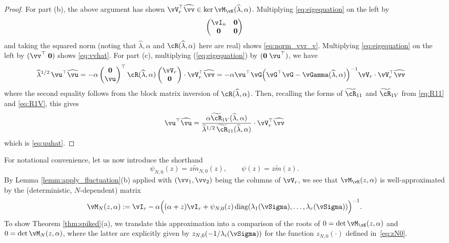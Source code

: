 \begin{proof}
For part (b), the above argument has shown $\vV_r^\top \widehat \vv \in \ker
\vM_{\vK}(\widehat\lambda,\alpha)$. Multiplying
\eqref{eq:eigequation} on the left by
$$\begin{pmatrix} \vI_n & \mathbf{0} \\
	\mathbf{0} & \mathbf{0} \end{pmatrix}$$
and taking the squared norm (noting that $\widehat\lambda,\alpha$
and $\vcR(\widehat\lambda,\alpha)$ here are real) shows \eqref{eq:norm_vvr_v}.
Multiplying \eqref{eq:eigequation} on the left by $(\vv^\top\;\mathbf{0})$ shows
\eqref{eq:vvhat}. For part (c),
multiplying (\ref{eq:eigequation}) by $(\mathbf{0}\;\vu^\top)$, we have
\begin{align*}
\widehat\lambda^{1/2}\,\vu^\top \widehat\vu&=-\alpha\begin{pmatrix} \mathbf{0}\\ \vu \end{pmatrix}^\top
\vcR(\widehat\lambda,\alpha)\begin{pmatrix} \vV_r \\ \mathbf{0} \end{pmatrix} \cdot \vV_r^\top \widehat\vv
=-\alpha \vu^\top \vG \Big(\vG^\top \vG-\vGamma(\widehat\lambda,\alpha)\Big)^{-1}\vV_r
\cdot \vV_r^\top \widehat\vv
\end{align*}
where the second equality follows from the block matrix inversion of
$\vcR(\widehat\lambda,\alpha)$.
Then, recalling the forms of $\widetilde
\cR_{11}$ and $\widetilde \vcR_{1V}$ from \eqref{eq:R11} and \eqref{eq:R1V},
this gives
\[\vu^\top \widehat\vu=\frac{\alpha \widetilde
\vcR_{1V}(\widehat\lambda,\alpha)}{\widehat\lambda^{1/2}\,\widetilde
\cR_{11}(\widehat\lambda,\alpha)} \cdot \vV_r^\top \widehat\vv\]
which is \eqref{eq:uuhat}.
\end{proof}

For notational convenience, let us now introduce the shorthand
\[\psi_{N,0}(z)=z\tilde m_{N,0}(z), \qquad \psi(z)=z\tilde m(z).\]
By Lemma \ref{lemm:apply_fluctuation}(b) applied with $(\vv_1,\vv_2)$ being the
columns of $\vV_r$,
we see that $\vM_{\vK}(z,\alpha)$ is well-approximated by the (deterministic,
$N$-dependent) matrix
\begin{align}\label{eq:M(z)}
\vM_N(z,\alpha):=\vI_r-\alpha\Big((\alpha+z)\vI_r+\psi_{N,0}(z)
\diag(\lambda_1(\vSigma),\ldots,\lambda_r(\vSigma))\Big)^{-1}.
\end{align} 
To show Theorem \ref{thm:spiked}(a), we translate this approximation into a
comparison of the roots of $0=\det \vM_{\vK}(z,\alpha)$ and $0=\det
\vM_N(z,\alpha)$,
where the latter are explicitly given by $z_{N,0}(-1/\lambda_i(\vSigma))$ for
the function $z_{N,0}(\cdot)$ defined in~\eqref{eq:zN0}.\\



